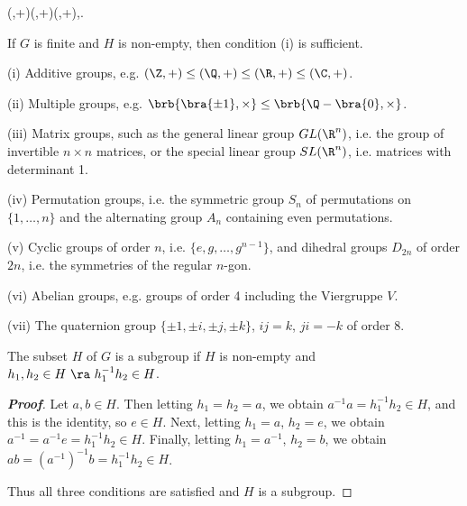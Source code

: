 \begin{example}
\be
(\Z,+)\leq (\Q,+)\leq (\R,+),\quad\quad {}\leq {}.
\ee
\end{example}

\begin{remark}
If $G$ is finite and $H$ is non-empty, then condition (i) is sufficient.
\end{remark}

\begin{example}
\ben
\item [(i)] Additive groups, e.g. $(\Z, +)\leq (\Q,+) \leq (\R, +) \leq (\C, +)$.
\item [(ii)] Multiple groups, e.g. $\brb{\bra{\pm 1},\times}\leq \brb{\Q-\bra{0},\times}$.
\item [(iii)] Matrix groups, such as the general linear group $GL(\R^n)$, i.e. the group of invertible $n\times n$ matrices, or the special linear group $SL(\R^n)$, i.e. matrices with determinant 1.
\item [(iv)] Permutation groups, i.e. the symmetric group $S_n$ of permutations on $\{1,\dots , n\}$ and the alternating group $A_n$ containing even permutations.
\item [(v)] Cyclic groups of order $n$, i.e. $\{e, g,\dots , g^{n-1}\}$, and dihedral groups $D_{2n}$ of order $2n$, i.e. the symmetries of the regular $n$-gon.
\item [(vi)] Abelian groups, e.g. groups of order 4 including the Viergruppe $V$.
\item [(vii)] The quaternion group $\{\pm 1,\pm i,\pm j,\pm k\}$, $ij = k$, $ji = -k$ of order 8.
\een
\end{example}




\begin{lemma}\label{lem:subgroup}
The subset $H$ of $G$ is a subgroup if $H$ is non-empty and $h_1,h_2\in H\ \ra\ h_1^{-1}h_2 \in H$.
\end{lemma}

\begin{proof}[\bf Proof]
Let $a,b\in H$. Then letting $h_1=h_2=a$, we obtain $a^{-1}a = h_1^{-1}h_2 \in H$, and this is the identity, so $e\in H$. Next, letting $h_1=a$, $h_2=e$, we obtain $a^{-1} = a^{-1}e = h_1^{-1}h_2 \in H$. Finally, letting $h_1=a^{-1}$, $h_2=b$, we obtain $ab = (a^{-1})^{-1}b = h_1^{-1}h_2\in H$.

Thus all three conditions are satisfied and $H$ is a subgroup.
\end{proof}

